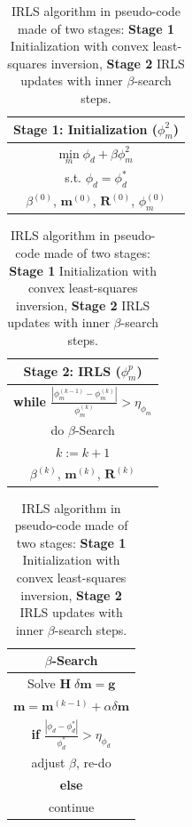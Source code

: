 \documentclass[extra,referee]{gji}
\begin{document}
\begin{table}\centering
\def\arraystretch{1.25}
\begin{tabular}{|c|}\hline
\bf{Stage 1}: Initialization ($\phi_m^2$)	\\ \hline
$\underset{m}{\text{min}}\; \phi_d + \beta \phi_m^2$\\
s.t. $\phi_d = \phi_d^*$ \\
$\beta^{(0)}$, $\mathbf{m}^{(0)}$, $\mathbf{R}^{(0)}$, $\phi_m^{(0)}$\\\hline
\end{tabular}
\begin{tabular}{|c|}\hline
\bf{Stage 2}: IRLS ($\phi_m^p$)	\\ \hline
\bf{while} \; $\frac{|\phi_m^{(k-1)}-\phi_m^{(k)}|}{\phi_m^{(k)}} > \eta_{\phi_m}$ \\
do $\beta$-Search \\
$k := k+1$\\
$\beta^{(k)}$, $\mathbf{m}^{(k)}$, $\mathbf{R}^{(k)}$\\\hline
\end{tabular}
\begin{tabular}{|c|}\hline
\textbf{$\beta$-Search} \\ \hline
Solve $\mathbf{H}\; \delta \mathbf{m} = \mathbf{g}$ \\
$\mathbf{m} = \mathbf{m}^{(k-1)} + \alpha \delta \mathbf{m}$ \\
\textbf{if} $\frac{|\phi_d - \phi_d^*|}{\phi_d^*} > \eta_{\phi_d} $ \\
adjust $\beta$, re-do\\
\textbf{else} \\
continue \\ \hline
\end{tabular}
\caption{IRLS algorithm in pseudo-code made of two stages: \textbf{Stage 1} Initialization with convex least-squares inversion, \textbf{Stage 2} IRLS updates with inner $\beta$-search steps.}
\label{IRLSalgo}
\end{table}
\end{document}
